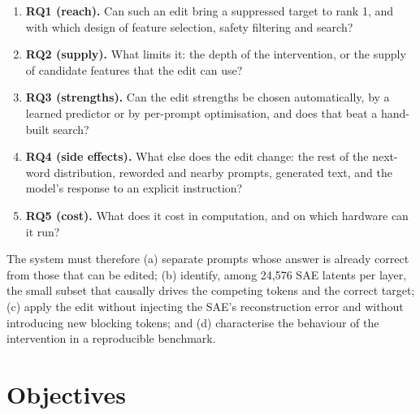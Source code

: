 \documentclass[12pt,a4paper]{report}
\begin{document}
\begin{enumerate}
  \item \textbf{RQ1 (reach).} Can such an edit bring a suppressed target to rank 1, and with which design of feature selection, safety filtering and search?
  \item \textbf{RQ2 (supply).} What limits it: the depth of the intervention, or the supply of candidate features that the edit can use?
  \item \textbf{RQ3 (strengths).} Can the edit strengths be chosen automatically, by a learned predictor or by per-prompt optimisation, and does that beat a hand-built search?
  \item \textbf{RQ4 (side effects).} What else does the edit change: the rest of the next-word distribution, reworded and nearby prompts, generated text, and the model's response to an explicit instruction?
  \item \textbf{RQ5 (cost).} What does it cost in computation, and on which hardware can it run?
\end{enumerate}

The system must therefore (a) separate prompts whose answer is already correct from those that can be edited; (b) identify, among 24,576 SAE latents per layer, the small subset that causally drives the competing tokens and the correct target; (c) apply the edit without injecting the SAE's reconstruction error and without introducing new blocking tokens; and (d) characterise the behaviour of the intervention in a reproducible benchmark.

\section{Objectives}
\end{document}
